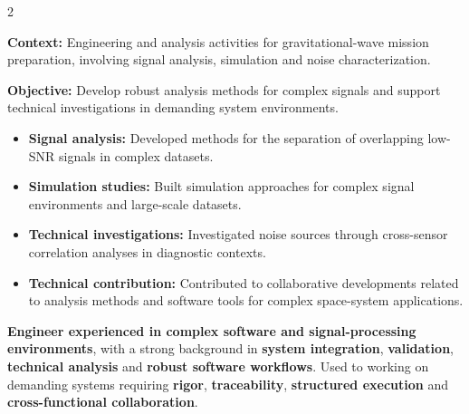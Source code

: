 \documentclass[8pt,a4paper,ragged2e,withhyper]{altacv}
\begin{document}
\begin{paracol}{2}
\divider


\textbf{Context:} Engineering and analysis activities for gravitational-wave mission preparation, involving signal analysis, simulation and noise characterization.

\textbf{Objective:} Develop robust analysis methods for complex signals and support technical investigations in demanding system environments.

\begin{itemize}
\item \textbf{Signal analysis:} Developed methods for the separation of overlapping low-SNR signals in complex datasets.
\item \textbf{Simulation studies:} Built simulation approaches for complex signal environments and large-scale datasets.
\item \textbf{Technical investigations:} Investigated noise sources through cross-sensor correlation analyses in diagnostic contexts.
\item \textbf{Technical contribution:} Contributed to collaborative developments related to analysis methods and software tools for complex space-system applications.
\end{itemize}




\switchcolumn

\textbf{Engineer experienced in complex software and signal-processing environments}, with a strong background in \textbf{system integration}, \textbf{validation}, \textbf{technical analysis} and \textbf{robust software workflows}. Used to working on demanding systems requiring \textbf{rigor}, \textbf{traceability}, \textbf{structured execution} and \textbf{cross-functional collaboration}.


\end{paracol}
\end{document}
